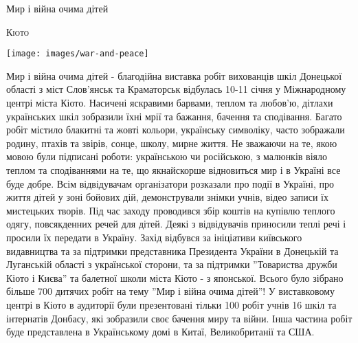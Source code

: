 \documentclass[10pt,a4paper]{article}
\newcommand{\NewsItem}[1]{%
		\usefont{T2A}{iwona}{m}{n} 
		\large #1 \vspace{4pt}
		\par \normalsize \normalfont}
\newcommand{\NewsAuthor}[1]{%
			\hfill \textsc{#1} \vspace{4pt}
			\par \normalfont}
\begin{document}
\begin{multicols}{3}
\vspace{1cm}
\NewsItem{Мир і війна очима дітей}
\NewsAuthor{Кіото}
		\begin{center}
			\texttt{[image: images/war-and-peace]}
		\end{center}
Мир і війна очима дітей - благодійна виставка робіт вихованців шкіл Донецької області з міст Слов'янськ та Краматорськ відбулась 10-11 січня у Міжнародному центрі міста Кіото.
Насичені яскравими барвами, теплом та любов'ю, дітлахи українських шкіл зобразили їхні мрії та бажання, бачення та сподівання. Багато робіт містило блакитні та жовті кольори, українську символіку, часто зображали родину, птахів та звірів, сонце, школу, мирне життя. Не зважаючи на те, якою мовою були підписані роботи: українською чи російською, з малюнків віяло теплом та сподіваннями на те, що якнайскорше відновиться мир і в Україні все буде добре.
Всім відвідувачам організатори розказали про події в Україні, про життя дітей у зоні бойових дій, демонстрували знімки учнів, відео записи їх мистецьких творів. 
Під час заходу проводився збір коштів на купівлю теплого одягу, повсякденних речей для дітей. Деякі з відвідувачів приносили теплі речі і просили їх передати в Україну.
Захід відбувся за ініціативи київського видавництва та за підтримки представника Президента України в Донецькій та Луганській області з української сторони, та за підтримки ''Товариства дружби Кіото і Києва'' та балетної школи міста Кіото - з японської. Всього було зібрано більше 700 дитячих робіт на тему ''Мир і війна очима дітей''! У виставковому центрі в Кіото в аудиторії були презентовані тільки 100 робіт учнів 16 шкіл та інтернатів Донбасу, які зобразили своє бачення миру та війни. Інша частина робіт буде представлена в Українському домі в Китаї, Великобританії та США.

\end{multicols}
\end{document}

